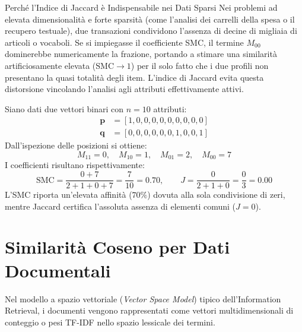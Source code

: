 \begin{noteblock}{Perché l'Indice di Jaccard è Indispensabile nei Dati Sparsi}
Nei problemi ad elevata dimensionalità e forte sparsità (come l'analisi dei carrelli della spesa o il recupero testuale), due transazioni condividono l'assenza di decine di migliaia di articoli o vocaboli. Se si impiegasse il coefficiente SMC, il termine $M_{00}$ dominerebbe numericamente la frazione, portando a stimare una similarità artificiosamente elevata ($\text{SMC} \to 1$) per il solo fatto che i due profili non presentano la quasi totalità degli item. L'indice di Jaccard evita questa distorsione vincolando l'analisi agli attributi effettivamente attivi.
\end{noteblock}

\begin{example}
Siano dati due vettori binari con $n = 10$ attributi:
\begin{align}
    \mathbf{p} &= [1, 0, 0, 0, 0, 0, 0, 0, 0, 0] \\
    \mathbf{q} &= [0, 0, 0, 0, 0, 0, 1, 0, 0, 1]
\end{align}
Dall'ispezione delle posizioni si ottiene:
\begin{equation}
    M_{11} = 0, \quad M_{10} = 1, \quad M_{01} = 2, \quad M_{00} = 7
\end{equation}
I coefficienti risultano rispettivamente:
\begin{equation}
    \text{SMC} = \frac{0 + 7}{2 + 1 + 0 + 7} = \frac{7}{10} = 0.70, \qquad
    J = \frac{0}{2 + 1 + 0} = \frac{0}{3} = 0.00
\end{equation}
L'SMC riporta un'elevata affinità ($70\%$) dovuta alla sola condivisione di zeri, mentre Jaccard certifica l'assoluta assenza di elementi comuni ($J = 0$).
\end{example}

\FloatBarrier
\section{Similarità Coseno per Dati Documentali}
\label{sec:dm-cosine-similarity}

Nel modello a spazio vettoriale (\textit{Vector Space Model}) tipico dell'Information Retrieval, i documenti vengono rappresentati come vettori multidimensionali di conteggio o pesi TF-IDF nello spazio lessicale dei termini.

